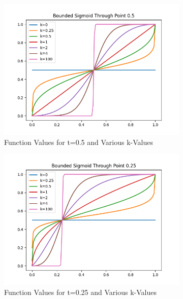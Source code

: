 \begin{figure}[htbp]
    \centering
    \begin{subfigure}[b]{0.3\textwidth}
        \includegraphics[width=\textwidth]{figures/soft_sigmoidt05.png}
        \caption{Function Values for t=0.5 and Various k-Values}
        \label{fig:sub1}
    \end{subfigure}
    \hfill
    \begin{subfigure}[b]{0.3\textwidth}
        \includegraphics[width=\textwidth]{figures/soft_sigmoidt25.png}
        \caption{Function Values for t=0.25 and Various k-Values}
        \label{fig:sub2}
    \end{subfigure}
    \begin{subfigure}[b]{0.3\textwidth}

\end{subfigure}
\end{figure}
